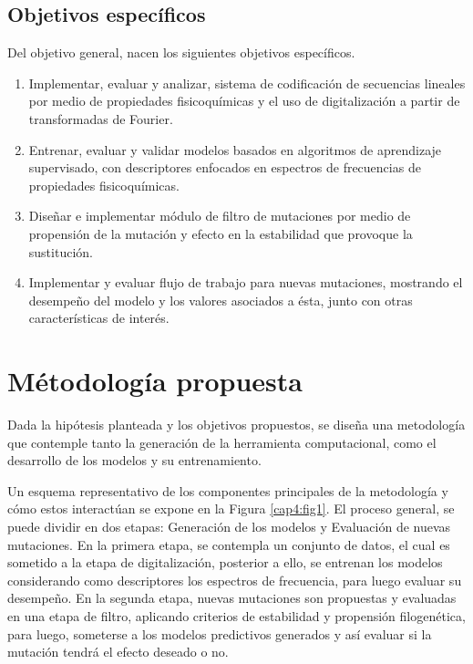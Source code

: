 \subsection{Objetivos específicos}

Del objetivo general, nacen los siguientes objetivos específicos.

\begin{enumerate}
	
	\item Implementar, evaluar y analizar, sistema de codificación de secuencias lineales por medio de propiedades fisicoquímicas y el uso de digitalización a partir de transformadas de Fourier.
	\item Entrenar, evaluar y validar modelos basados en algoritmos de aprendizaje supervisado, con descriptores enfocados en espectros de frecuencias de propiedades fisicoquímicas.
	\item Diseñar e implementar módulo de filtro de mutaciones por medio de propensión de la mutación y efecto en la estabilidad que provoque la sustitución.
	\item Implementar y evaluar flujo de trabajo para nuevas mutaciones, mostrando el desempeño del modelo y los valores asociados a ésta, junto con otras características de	interés.
	
\end{enumerate}

\section{Métodología propuesta}

Dada la hipótesis planteada y los objetivos propuestos, se diseña una metodología que contemple tanto la generación de la herramienta computacional, como el desarrollo de los modelos y su entrenamiento.

Un esquema representativo de los componentes principales de la metodología y cómo estos interactúan se expone en la Figura \ref{cap4:fig1}. El proceso general, se puede dividir en dos etapas: Generación de los modelos y Evaluación de nuevas mutaciones. En la primera etapa, se contempla un conjunto de datos, el cual es sometido a la etapa de digitalización, posterior a ello, se entrenan los modelos considerando como descriptores los espectros de frecuencia, para luego evaluar su desempeño. En la segunda etapa, nuevas mutaciones son propuestas y evaluadas en una etapa de filtro, aplicando criterios de estabilidad y propensión filogenética, para luego, someterse a los modelos predictivos generados y así evaluar si la mutación tendrá el efecto deseado o no.


